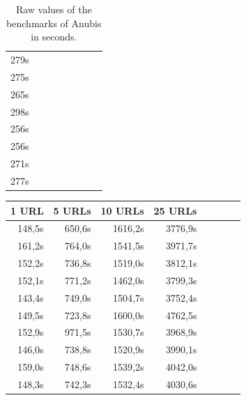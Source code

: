 \documentclass{scrartcl}
\begin{document}
\begin{table}[h]
\begin{tabular}{@{}llllllll@{}}
\multicolumn{1}{r}{279s} &  & \\
\multicolumn{1}{r}{275s} &  & \\
\multicolumn{1}{r}{265s} &  & \\
\multicolumn{1}{r}{298s} &  & \\
\multicolumn{1}{r}{256s} &  & \\
\multicolumn{1}{r}{256s} &  & \\
\multicolumn{1}{r}{271s} &  & \\
\multicolumn{1}{r}{277s} &  & \\ \bottomrule
\end{tabular}
\caption{Raw values of the benchmarks of Anubis in seconds.}
\label{rawdata_an}
\end{table}

\begin{table}[h]
\center
\begin{tabular}{@{}llllllll@{}}
\toprule
1 URL       & 5 URLs      & 10 URLs      & 25 URLs      \\ \midrule
\multicolumn{1}{r}{148,5s} & \multicolumn{1}{r}{650,6s} & \multicolumn{1}{r}{1616,2s} & \multicolumn{1}{r}{3776,9s} \\
 \multicolumn{1}{r}{161,2s} & \multicolumn{1}{r}{764,0s} & \multicolumn{1}{r}{1541,5s} & \multicolumn{1}{r}{3971,7s} \\
 \multicolumn{1}{r}{152,2s} & \multicolumn{1}{r}{736,8s} & \multicolumn{1}{r}{1519,0s} & \multicolumn{1}{r}{3812,1s} \\
 \multicolumn{1}{r}{152,1s} & \multicolumn{1}{r}{771,2s} & \multicolumn{1}{r}{1462,0s} & \multicolumn{1}{r}{3799,3s} \\
 \multicolumn{1}{r}{143,4s} & \multicolumn{1}{r}{749,0s} & \multicolumn{1}{r}{1504,7s} & \multicolumn{1}{r}{3752,4s} \\
 \multicolumn{1}{r}{149,5s} & \multicolumn{1}{r}{723,8s} & \multicolumn{1}{r}{1600,0s} & \multicolumn{1}{r}{4762,5s} \\
 \multicolumn{1}{r}{152,9s} & \multicolumn{1}{r}{971,5s} & \multicolumn{1}{r}{1530,7s} & \multicolumn{1}{r}{3968,9s} \\
 \multicolumn{1}{r}{146,0s} & \multicolumn{1}{r}{738,8s} & \multicolumn{1}{r}{1520,9s} & \multicolumn{1}{r}{3990,1s} \\
 \multicolumn{1}{r}{159,0s} & \multicolumn{1}{r}{748,6s} & \multicolumn{1}{r}{1539,2s} & \multicolumn{1}{r}{4042,0s} \\
 \multicolumn{1}{r}{148,3s} & \multicolumn{1}{r}{742,3s} & \multicolumn{1}{r}{1532,4s} & \multicolumn{1}{r}{4030,6s} \\

\end{tabular}
\end{table}
\end{document}
